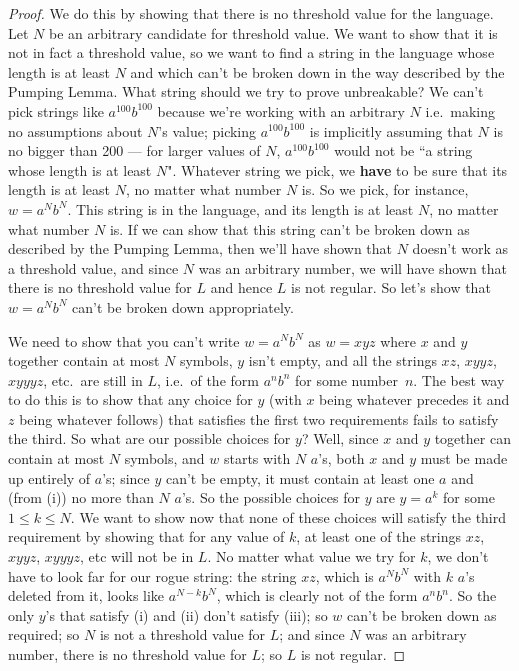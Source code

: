 \begin{proof} We do this by showing that there is no threshold value for the language.  Let
$N$ be an arbitrary candidate for threshold value.  We want to show that it is
not in fact a threshold value, so we want to find a string in the language
whose length is at least $N$ and which can't be broken down in the way
described by the Pumping Lemma.  What string should we try to prove
unbreakable?  We can't pick strings like $a^{100}b^{100}$ because we're
working with an arbitrary $N$ i.e.\ making no assumptions about $N$'s value; 
picking $a^{100}b^{100}$ is implicitly assuming that $N$ is no bigger than 200
--- for larger values of $N$, $a^{100}b^{100}$ would not be ``a string whose
length is at least $N$".  Whatever string we pick, we {\bf have} to be sure 
that its
length is at least $N$, no matter what number $N$ is.  So we pick, for instance,
$w = a^Nb^N$.  This string is in the language, and its length is at least $N$,
no matter what number $N$ is. 
If we can show that this string can't be broken down as described by the
Pumping Lemma, then we'll have shown that $N$ doesn't work as a threshold
value, and since $N$ was an arbitrary number, we will have shown that there is no
threshold value for $L$ and hence $L$ is not regular.  So let's show that $w =
a^Nb^N$ can't be broken down appropriately. 

We need to show that you can't
write $w = a^Nb^N$ as $w=xyz$ where $x$ and $y$ together contain at most $N$
symbols, $y$ isn't empty, and all the strings $xz$, $xyyz$, $xyyyz$, etc.\ are
still in $L$, i.e.\ of the form $a^nb^n$ for some number~$n$.  The best way to
do this is to show that any choice for $y$ (with $x$ being whatever precedes it
and $z$ being whatever follows) that satisfies the first two requirements fails
to satisfy the third.  So what are our possible choices for $y$?
Well, since $x$ and $y$ together can contain at most $N$
symbols, and $w$ starts with $N$ $a$'s, both $x$ and $y$ must be made up
entirely of $a$'s; since $y$ can't be empty, it must contain at least one $a$
and (from (i)) no more than $N$ $a$'s. So the possible
choices for $y$ are $y=a^k$ for some $1 \leq k \leq N$. We want to show now
that none of these choices will satisfy the third requirement by showing that
for any value of $k$, at least one of the strings $xz$, $xyyz$, $xyyyz$, etc
will not be in $L$.  No matter what value we try for $k$, we don't have to 
look far for our rogue string: the string
$xz$, which is $a^Nb^N$ with $k$ $a$'s deleted from it, looks like
$a^{N-k}b^N$, which is clearly not of the form $a^nb^n$.  So the only
$y$'s that satisfy (i) and (ii) don't satisfy (iii); so $w$ can't be broken
down as required; so $N$ is not a threshold value for $L$; and since $N$ was an
arbitrary number, there is no threshold value for $L$; so $L$ is not regular.
\end{proof}

